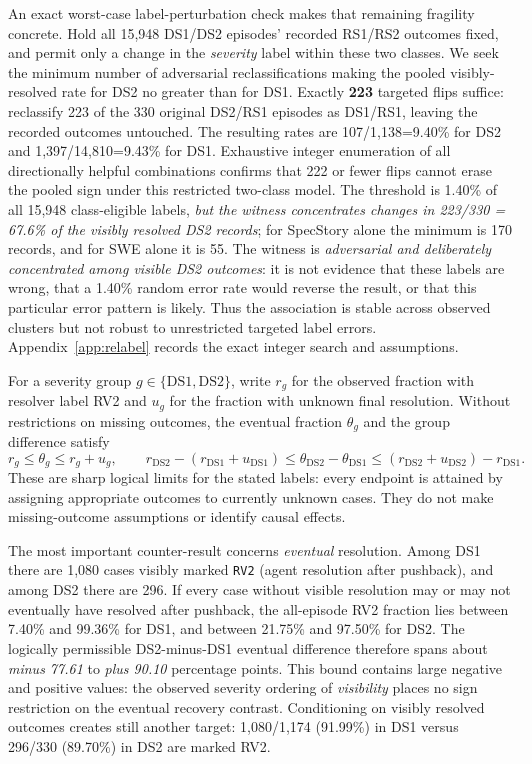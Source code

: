 An exact worst-case label-perturbation check makes that remaining fragility concrete. Hold all 15,948 DS1/DS2 episodes' recorded RS1/RS2 outcomes fixed, and permit only a change in the \emph{severity} label within these two classes. We seek the minimum number of adversarial reclassifications making the pooled visibly-resolved rate for DS2 no greater than for DS1. Exactly \textbf{223} targeted flips suffice: reclassify 223 of the 330 original DS2/RS1 episodes as DS1/RS1, leaving the recorded outcomes untouched. The resulting rates are 107/1,138=9.40\% for DS2 and 1,397/14,810=9.43\% for DS1. Exhaustive integer enumeration of all directionally helpful combinations confirms that 222 or fewer flips cannot erase the pooled sign under this restricted two-class model. The threshold is 1.40\% of all 15,948 class-eligible labels, \emph{but the witness concentrates changes in 223/330 = 67.6\% of the visibly resolved DS2 records}; for SpecStory alone the minimum is 170 records, and for SWE alone it is 55. The witness is \emph{adversarial and deliberately concentrated among visible DS2 outcomes}: it is not evidence that these labels are wrong, that a 1.40\% random error rate would reverse the result, or that this particular error pattern is likely. Thus the association is stable across observed clusters but not robust to unrestricted targeted label errors. Appendix~\ref{app:relabel} records the exact integer search and assumptions.

For a severity group $g\in\{\mathrm{DS1},\mathrm{DS2}\}$, write $r_g$ for the observed fraction with resolver label RV2 and $u_g$ for the fraction with unknown final resolution. Without restrictions on missing outcomes, the eventual fraction $\theta_g$ and the group difference satisfy
\begin{equation}\label{eq:severity-bounds}
 r_g\leq \theta_g\leq r_g+u_g,\qquad
 r_{\mathrm{DS2}}-(r_{\mathrm{DS1}}+u_{\mathrm{DS1}})\leq \theta_{\mathrm{DS2}}-\theta_{\mathrm{DS1}} \leq (r_{\mathrm{DS2}}+u_{\mathrm{DS2}})-r_{\mathrm{DS1}}.
\end{equation}
These are sharp logical limits for the stated labels: every endpoint is attained by assigning appropriate outcomes to currently unknown cases. They do not make missing-outcome assumptions or identify causal effects.

The most important counter-result concerns \emph{eventual} resolution. Among DS1 there are 1,080 cases visibly marked \texttt{RV2} (agent resolution after pushback), and among DS2 there are 296. If every case without visible resolution may or may not eventually have resolved after pushback, the all-episode RV2 fraction lies between 7.40\% and 99.36\% for DS1, and between 21.75\% and 97.50\% for DS2. The logically permissible DS2-minus-DS1 eventual difference therefore spans about \emph{minus 77.61} to \emph{plus 90.10} percentage points. This bound contains large negative and positive values: the observed severity ordering of \emph{visibility} places no sign restriction on the eventual recovery contrast. Conditioning on visibly resolved outcomes creates still another target: 1,080/1,174 (91.99\%) in DS1 versus 296/330 (89.70\%) in DS2 are marked RV2.

